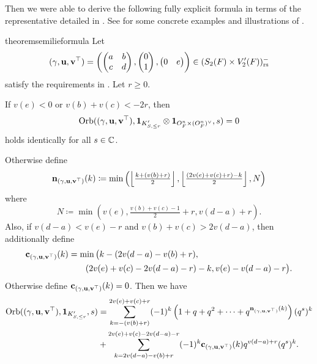 Then we were able to derive the following fully explicit formula
in terms of the representative detailed in .
See  for some concrete examples
and illustrations of .
\begin{restatable}{theorem}{semilieformula}
  \label{thm:semi_lie_formula}
  Let
  \[
    {(\gamma, \mathbf u, \mathbf v^\top)} = \left( \begin{pmatrix} a & b \\ c & d \end{pmatrix},
      \begin{pmatrix} 0 \\ 1 \end{pmatrix},
      \begin{pmatrix} 0 & e \end{pmatrix} \right)
    \in (S_2(F) \times V_2'(F))_{\mathrm{rs}}^-
  \]
  satisfy the requirements in .
  Let $r \ge 0$.

  If $v(e) < 0$ or $v(b) + v(c) < -2r$, then
  \[ \operatorname{Orb}({(\gamma, \mathbf u, \mathbf v^\top)}, \mathbf{1}_{K'_{S, \le r}} \otimes \mathbf{1}_{O_F^n \times (O_F^n)^\vee}, s) = 0 \]
  holds identically for all $s \in \mathbb C$.

  Otherwise define
  \[ \mathbf n_{(\gamma, \mathbf u, \mathbf v^\top)}(k) \coloneqq \min\left( \left\lfloor \tfrac{k + (v(b)+r)}{2} \right\rfloor,
    \left\lfloor \tfrac{(2v(e)+v(c)+r)-k}{2} \right\rfloor, N \right) \]
  where
  \[ N \coloneqq \min \left(
      v(e), \tfrac{v(b)+v(c)-1}{2} + r,
      v(d-a) + r \right). \]
  Also, if $v(d-a) < v(e) - r$ and $v(b) + v(c) > 2v(d-a)$, then additionally define
  \begin{align*}
    \mathbf c_{(\gamma, \mathbf u, \mathbf v^\top)}(k) &= \min\big( k - (2v(d-a)-v(b)+r), \\
      &\qquad (2v(e)+v(c)-2v(d-a)-r)-k, v(e)-v(d-a)-r \big).
  \end{align*}
  Otherwise define $\mathbf c_{(\gamma, \mathbf u, \mathbf v^\top)}(k) = 0$.
  Then we have
  \begin{align*}
    \operatorname{Orb}({(\gamma, \mathbf u, \mathbf v^\top)}, \mathbf{1}_{K'_{S, \le r}}, s)
    &= \sum_{k = -(v(b)+r)}^{2v(e)+v(c)+r} (-1)^k
    \left( 1 + q + q^2 + \dots + q^{\mathbf n_{(\gamma, \mathbf u, \mathbf v^\top)}(k)} \right) (q^s)^k \\
    &+ \sum_{k = 2v(d-a)-v(b)+r}^{2v(e)+v(c)-2v(d-a)-r} (-1)^k \mathbf c_{(\gamma, \mathbf u, \mathbf v^\top)}(k) q^{v(d-a) + r} (q^s)^k.
  \end{align*}
\end{restatable}

